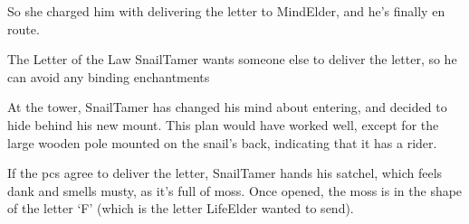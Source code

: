 So she charged him with delivering the letter to \gls{MindElder}, and he's finally en route.

{The Letter of the Law}%
{\gls{SnailTamer} wants someone else to deliver the letter, so he can avoid any binding enchantments}%

At the tower, \gls{SnailTamer} has changed his mind about entering, and decided to hide behind his new mount.
This plan would have worked well, except for the large wooden pole mounted on the snail's back, indicating that it has a rider.

If the \glspl{pc} agree to deliver the letter,
\gls{SnailTamer} hands his satchel, which feels dank and smells musty, as it's full of moss.
Once opened, the moss is in the shape of the letter `F' (which is the letter \gls{LifeElder} wanted to send).

